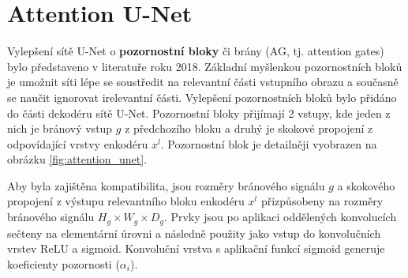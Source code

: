 \section{Attention U-Net}
\label{sec:Chapter24}

Vylepšení sítě U-Net o \textbf{pozornostní bloky} či brány (AG, tj. attention gates) bylo představeno v literatuře \cite{attentionunet} roku 2018. Základní myšlenkou pozornostních bloků je umožnit síti lépe se soustředit na relevantní části vstupního obrazu a současně se naučit ignorovat irelevantní části. Vylepšení pozornostních bloků bylo přidáno do části dekodéru sítě U-Net. Pozornostní bloky přijímají 2 vstupy, kde jeden z nich je bránový vstup $g$ z předchozího bloku a druhý je skokové propojení z odpovídající vrstvy enkodéru $x^l$. Pozornostní blok je detailněji vyobrazen na obrázku \ref{fig:attention_unet}.

Aby byla zajištěna kompatibilita, jsou rozměry bránového signálu $g$ a skokového propojení z výstupu relevantního bloku enkodéru $x^l$ přizpůsobeny na rozměry bránového signálu $H_g \times W_g \times D_g$. Prvky jsou po aplikaci oddělených konvolucích sečteny na elementární úrovni a následně použity jako vstup do konvolučních vrstev ReLU a sigmoid. Konvoluční vrstva s aplikační funkcí sigmoid generuje koeficienty pozornosti ($\alpha_i$).

